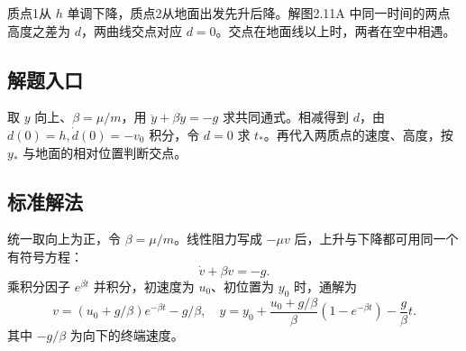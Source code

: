 \documentclass[UTF8,fontset=fandol,a4paper,11pt]{ctexart}
\begin{document}
质点1从 $h$ 单调下降，质点2从地面出发先升后降。解图2.11A 中同一时间的两点高度之差为 $d$，两曲线交点对应 $d=0$。交点在地面线以上时，两者在空中相遇。



\subsection*{解题入口}

取 $y$ 向上、$\beta=\mu/m$，用 $\ddot y+\beta\dot y=-g$ 求共同通式。相减得到 $d$，由 $d(0)=h,\dot d(0)=-v_0$ 积分，令 $d=0$ 求 $t_*$。再代入两质点的速度、高度，按 $y_*$ 与地面的相对位置判断交点。



\subsection*{标准解法}

统一取向上为正，令 $\beta=\mu/m$。线性阻力写成 $-\mu v$ 后，上升与下降都可用同一个有符号方程：
\[
\dot v+\beta v=-g.
\]
乘积分因子 $e^{\beta t}$ 并积分，初速度为 $u_0$、初位置为 $y_0$ 时，通解为
\[
v=(u_0+g/\beta)e^{-\beta t}-g/\beta,
\quad y=y_0+\frac{u_0+g/\beta}{\beta}(1-e^{-\beta t})-\frac g\beta t.
\]
其中 $-g/\beta$ 为向下的终端速度。
\end{document}
